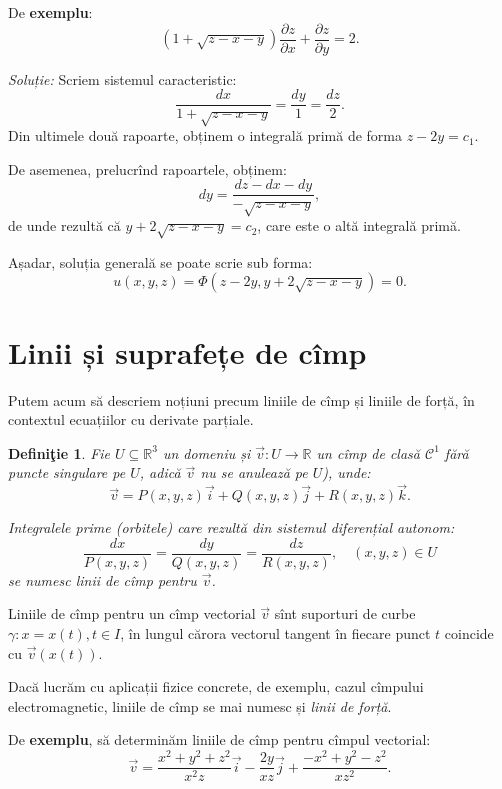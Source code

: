 \documentclass[11pt,a4paper]{article}
\newcommand\kal{\mathcal}
\newcommand\seq{\subseteq}
\newcommand\RR{\mathbb{R}}
\theoremstyle{dotless}
\theoremstyle{dotlessdr}
\newtheorem{definition}{Defini\c{t}ie}[section]
\begin{document}
De \textbf{exemplu}:
\[
  (1 + \sqrt{z - x - y}) \frac{\partial z}{\partial x} + \frac{\partial z}{\partial y} = 2.
\]

\emph{Soluție:} Scriem sistemul caracteristic:
\[
  \frac{dx}{1 + \sqrt{z - x - y}} = \frac{dy}{1} = \frac{dz}{2}.
\]
Din ultimele două rapoarte, obținem o integrală primă de forma $ z - 2y = c_1 $.

De asemenea, prelucrînd rapoartele, obținem:
\[
  dy = \frac{dz - dx - dy}{- \sqrt{z - x - y}},
\]
de unde rezultă că $ y + 2\sqrt{z - x - y} = c_2 $, care este o altă integrală primă.

Așadar, soluția generală se poate scrie sub forma:
\[
  u(x, y, z) = \Phi(z - 2y, y + 2\sqrt{z - x - y}) = 0.
\]


\section{Linii și suprafețe de cîmp}

Putem acum să descriem noțiuni precum liniile de cîmp și liniile de forță, în contextul
ecuațiilor cu derivate parțiale.

\begin{definition}\label{def:linii-cimp}
  Fie $ U \seq \RR^3 $ un domeniu și $ \vec{v} : U \to \RR $ un cîmp de clasă $ \kal{C}^1 $
  fără puncte singulare pe $ U $, adică $ \vec{v} $ nu se anulează pe $ U $), unde:
  \[
    \vec{v} = P(x, y, z) \vec{i} + Q(x, y, z) \vec{j} + R(x, y, z) \vec{k}.
  \]

  Integralele prime (orbitele) care rezultă din sistemul diferențial autonom:
  \begin{equation} \label{eq:sist-cimp}
    \frac{dx}{P(x, y, z)} = \frac{dy}{Q(x, y, z)} = \frac{dz}{R(x, y, z)}, \quad (x, y, z) \in U
  \end{equation}
  se numesc \emph{linii de cîmp} pentru $ \vec{v} $.
\end{definition}

Liniile de cîmp pentru un cîmp vectorial $ \vec{v} $ sînt suporturi de curbe $ \gamma: x = x(t), t \in I$,
în lungul cărora vectorul tangent în fiecare punct $ t $ coincide cu $ \vec{v}(x(t)) $.

Dacă lucrăm cu aplicații fizice concrete, de exemplu, cazul cîmpului electromagnetic, liniile
de cîmp se mai numesc și \emph{linii de forță}.

De \textbf{exemplu}, să determinăm liniile de cîmp pentru cîmpul vectorial:
\[
  \vec{v} = \frac{x^2 + y^2 + z^2}{x^2 z} \vec{i} - \frac{2y}{xz} \vec{j} + \frac{-x^2 + y^2 - z^2}{xz^2}.
\]
\end{document}
